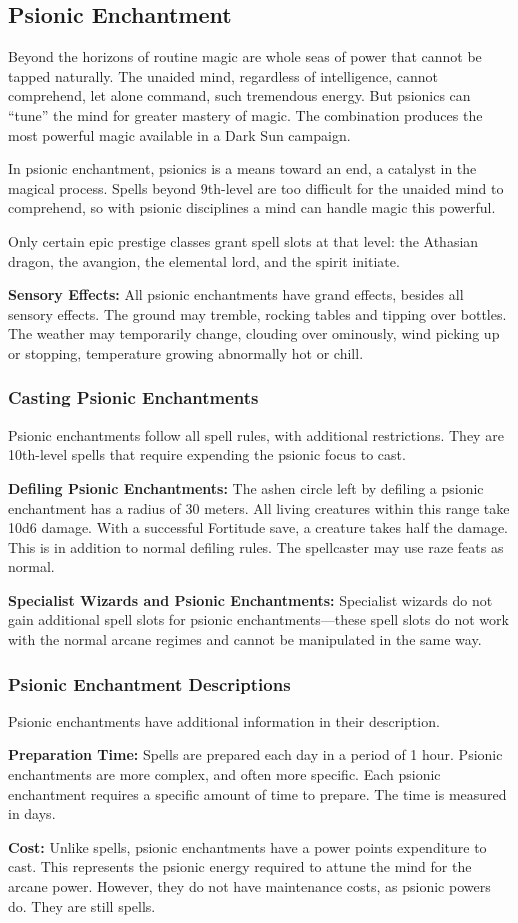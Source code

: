 \subsection{Psionic Enchantment}
Beyond the horizons of routine magic are whole seas of power that cannot be tapped naturally. The unaided mind, regardless of intelligence, cannot comprehend, let alone command, such tremendous energy. But psionics can ``tune'' the mind for greater mastery of magic. The combination produces the most powerful magic available in a {\tableheader Dark Sun} campaign.

In psionic enchantment, psionics is a means toward an end, a catalyst in the magical process. Spells beyond 9th-level are too difficult for the unaided mind to comprehend, so with psionic disciplines a mind can handle magic this powerful.

Only certain epic prestige classes grant spell slots at that level: the Athasian dragon, the avangion, the elemental lord, and the spirit initiate.

\textbf{Sensory Effects:} All psionic enchantments have grand effects, besides all sensory effects. The ground may tremble, rocking tables and tipping over bottles. The weather may temporarily change, clouding over ominously, wind picking up or stopping, temperature growing abnormally hot or chill.

\subsubsection{Casting Psionic Enchantments}
Psionic enchantments follow all spell rules, with additional restrictions. They are 10th-level spells that require expending the psionic focus to cast.

\textbf{Defiling Psionic Enchantments:} The ashen circle left by defiling a psionic enchantment has a radius of 30 meters. All living creatures within this range take 10d6 damage. With a successful Fortitude save, a creature takes half the damage. This is in addition to normal defiling rules. The spellcaster may use raze feats as normal.

\textbf{Specialist Wizards and Psionic Enchantments:} Specialist wizards do not gain additional spell slots for psionic enchantments---these spell slots do not work with the normal arcane regimes and cannot be manipulated in the same way.

\subsubsection{Psionic Enchantment Descriptions}
Psionic enchantments have additional information in their description.

\textbf{Preparation Time:} Spells are prepared each day in a period of 1 hour. Psionic enchantments are more complex, and often more specific. Each psionic enchantment requires a specific amount of time to prepare. The time is measured in days.

\textbf{Cost:} Unlike spells, psionic enchantments have a power points expenditure to cast. This represents the psionic energy required to attune the mind for the arcane power. However, they do not have maintenance costs, as psionic powers do. They are still spells.
